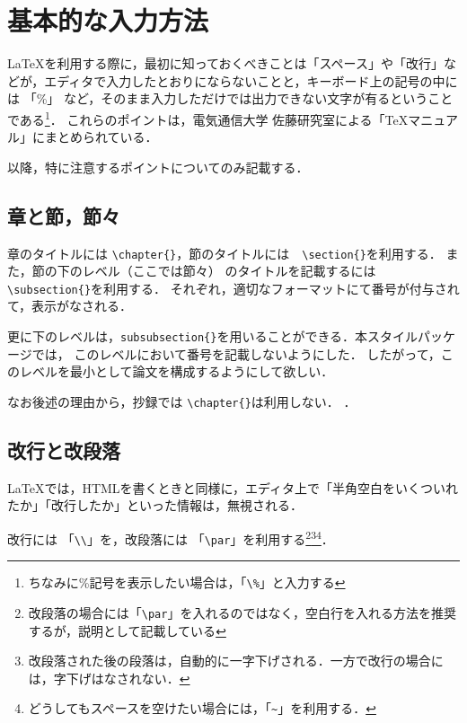 \documentclass[a4paper,10pt,twocolumn]{jsarticle}
\begin{document}
\section{基本的な入力方法}
\LaTeX を利用する際に，最初に知っておくべきことは「スペース」や「改行」などが，エディタで入力したとおりにならないことと，キーボード上の記号の中には 「\%」 など，そのまま入力しただけでは出力できない文字が有るということである\footnote{ちなみに\%記号を表示したい場合は，「\verb+\%+」と入力する}．
これらのポイントは，電気通信大学 佐藤研究室による「TeXマニュアル」\cite{HTUlatex}にまとめられている．

以降，特に注意するポイントについてのみ記載する．
\subsection{章と節，節々}
章のタイトルには \verb+\chapter{}+，節のタイトルには　\verb+\section{}+を利用する．
また，節の下のレベル（ここでは節々） のタイトルを記載するには \verb+\subsection{}+を利用する．
それぞれ，適切なフォーマットにて番号が付与されて，表示がなされる．

更に下のレベルは，\verb+subsubsection{}+を用いることができる．本スタイルパッケージでは，
このレベルにおいて番号を記載しないようにした．
したがって，このレベルを最小として論文を構成するようにして欲しい．

なお後述の理由から，抄録では \verb+\chapter{}+は利用しない．
．

\subsection{改行と改段落}
\LaTeX では，HTMLを書くときと同様に，エディタ上で「半角空白をいくついれたか」「改行したか」といった情報は，無視される．

改行には 「\verb+\\+」を，改段落には 「\verb+\par+」を利用する\footnote{改段落の場合には「\verb+\par+」を入れるのではなく，空白行を入れる方法を推奨するが，説明として記載している}\footnote{改段落された後の段落は，自動的に一字下げされる．一方で改行の場合には，字下げはなされない．}\footnote{どうしてもスペースを空けたい場合には，「\verb+~+」を利用する．}．
\end{document}
